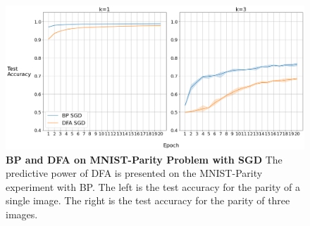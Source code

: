 \documentclass[a4paper, nobind]{templates/ociamthesis}
\begin{document}
\begin{figure}

{\centering \includegraphics[width=1\linewidth]{figures/3_k13_SGD_DFAvsBP} 

}

\caption[BP and DFA on MNIST-Parity Problem with SGD]{ \textbf{BP and DFA on MNIST-Parity Problem with SGD} \newline The predictive power of DFA is presented on the MNIST-Parity experiment with BP. The left is the test accuracy for the parity of a single image. The right is the test accuracy for the parity of three images.}\label{fig:BPvsDFA}
\end{figure}
\end{document}
